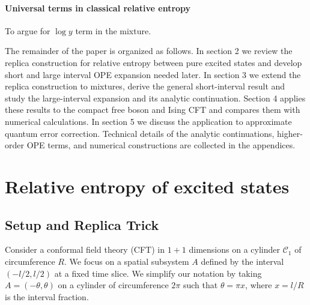 \documentclass[11pt]{article}
\newcommand{\nn}{\nonumber}
\begin{document}
 
  \paragraph{Universal terms in classical relative entropy}
  To argue for $\log y$ term in the mixture.

The remainder of the paper is organized as follows. In section 2 we review the replica construction for relative entropy between pure excited states and develop short and large interval OPE expansion needed later. In section 3 we extend the replica construction to mixtures, derive the general short-interval result and study the large-interval expansion and its analytic continuation. Section 4 applies these results to the compact free boson and Ising CFT and compares them with numerical calculations. In section 5 we discuss the application to approximate quantum error correction. Technical details of the analytic continuations, higher-order OPE terms, and numerical constructions are collected in the appendices. 


\section{Relative entropy of excited states}

\subsection{Setup and Replica Trick}

  Consider a conformal field theory (CFT) in $1+1$ dimensions on a cylinder
  $\mathcal{C}_{1}$ of circumference $R$. We focus on a spatial subsystem $A$ defined
  by the interval $(-l/2, l/2)$ at a fixed time slice. We simplify our notation
  by taking $A=(-\theta,\theta)$ on a cylinder of circumference $2\pi$ such that
  $\theta=\pi x$, where $x=l/R$ is the interval fraction.
\end{document}
